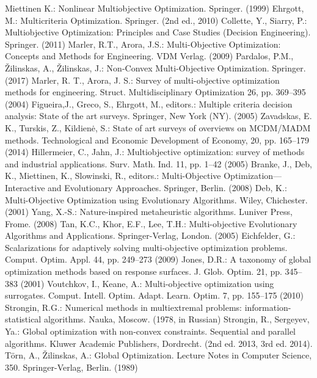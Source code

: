 \documentclass[smallextended]{svjour3}       %
\begin{document}
\begin{thebibliography}{}
 Miettinen K.: Nonlinear Multiobjective Optimization. Springer. (1999)
 Ehrgott, M.: Multicriteria Optimization. Springer. (2nd ed., 2010)
 Collette, Y., Siarry, P.: Multiobjective Optimization: Principles and Case Studies (Decision Engineering). Springer. (2011)
 Marler, R.T., Arora, J.S.: Multi-Objective Optimization: Concepts and Methods for Engineering. VDM Verlag. (2009)
 Pardalos, P.M., {\v Z}ilinskas, A., {\v Z}ilinskas, J.: Non-Convex Multi-Objective Optimization. Springer. (2017)
 Marler, R. T., Arora, J. S.: Survey of multi-objective optimization methods for engineering. Struct. Multidisciplinary Optimization 26, pp. 369--395 (2004)
 Figueira,J., Greco, S., Ehrgott, M., editors.: Multiple criteria decision analysis: State of the art surveys. Springer, New York (NY). (2005)
 Zavadskas, E. K., Turskis, Z., Kildien\.e, S.: State of art surveys of overviews on MCDM/MADM methods. Technological and Economic Development of Economy, 20, pp. 165--179 (2014)
 Hillermeier, C., Jahn, J.: Multiobjective optimization: survey of methods and industrial applications. Surv. Math. Ind. 11, pp. 1--42 (2005)
 Branke, J., Deb, K., Miettinen, K., Slowinski, R., editors.: Multi-Objective Optimization—Interactive and Evolutionary Approaches. Springer, Berlin. (2008)
 Deb, K.: Multi-Objective Optimization using Evolutionary Algorithms. Wiley, Chichester. (2001)
 Yang, X.-S.: Nature-inspired metaheuristic algorithms. Luniver Press, Frome. (2008) 
 Tan, K.C., Khor, E.F., Lee, T.H.: Multi-objective Evolutionary Algorithms and Applications. Springer-Verlag, London. (2005)
 Eichfelder, G.: Scalarizations for adaptively solving multi-objective optimization problems. Comput. Optim. Appl. 44, pp. 249--273 (2009)
 Jones, D.R.: A taxonomy of global optimization methods based on response surfaces. J. Glob. Optim. 21, pp. 345--383 (2001)
 Voutchkov, I., Keane, A.: Multi-objective optimization using surrogates. Comput. Intell. Optim. Adapt. Learn. Optim. 7, pp. 155--175 (2010)
 Strongin, R.G.: Numerical methods in multiextremal problems: information-statistical algorithms. Nauka, Moscow. (1978, in Russian) 
 Strongin, R., Sergeyev, Ya.: Global optimization with non-convex constraints. Sequential and parallel algorithms. Kluwer Academic Publishers, Dordrecht. (2nd ed. 2013, 3rd ed. 2014).
 T\"orn, A., {\v Z}ilinskas, A.: Global Optimization. Lecture Notes in Computer Science, 350. Springer-Verlag, Berlin. (1989)

\end{thebibliography}
\end{document}
